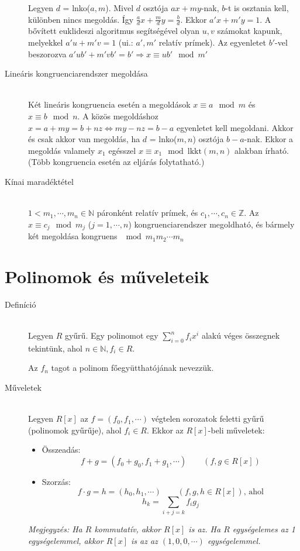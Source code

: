 \documentclass[margin=0px]{article}
\newcommand{\N}{\mathbb{N}}
\newcommand{\Z}{\mathbb{Z}}
\begin{document}
\begin{description}
        Legyen $d$ = lnko($a,m$). Mivel $d$ osztója $ax+my$-nak, $b$-t is osztania kell, különben nincs megoldás. Így $\frac{a}{d}x+\frac{m}{d}y = \frac{b}{d}$. Ekkor $a'x+m'y = 1$. A bővített euklideszi algoritmus segítségével olyan $u,v$ számokat kapunk, melyekkel $a'u+m'v = 1$ (ui.: $a', m'$ relatív prímek). Az egyenletet $b'$-vel beszorozva $a'ub'+m'vb' = b' \Rightarrow x \equiv ub' \mod{m'}$
    \item[Lineáris kongruenciarendszer megoldása] \hfill \\
        Két lineáris kongruencia esetén a megoldások $x \equiv a \mod{m}$ és $x \equiv b \mod{n}$. A közös megoldáshoz $x = a + my = b+ nz \Leftrightarrow my-nz = b-a$ egyenletet kell megoldani. Akkor és csak akkor van megoldás, ha $d$ = lnko($m,n$) osztója $b-a$-nak. Ekkor a megoldás valamely $x_1$ egésszel ${ x \equiv x_1 \mod{\textrm{lkkt}(m,n)}}$ alakban írható. (Több kongruencia esetén az eljárás folytatható.)
    \item[Kínai maradéktétel] \hfill \\
        $1 < m_1,\cdots,m_n \in\N$ páronként relatív prímek, és $c_1,\cdots,c_n \in\Z$. Az $x \equiv c_j \mod{m_j}$ ($j=1,\cdots,n$) kongruenciarendszer megoldható, és bármely két megoldása kongruens  $\mod{m_1m_2\cdots m_n}$
\end{description}
\section{Polinomok és műveleteik}
\begin{description}
    \item[Definíció] \hfill \\
        Legyen $R$ gyűrű. Egy polinomot egy $\sum_{i=0}^{n} f_ix^i$ alakú véges összegnek tekintünk, ahol $n\in\N, f_i \in R$.

        Az $f_n$ tagot a polinom főegyütthatójának nevezzük.
    \item[Műveletek] \hfill \\
        Legyen $R[x]$ az $f = (f_0, f_1, \cdots)$ végtelen sorozatok feletti gyűrű (polinomok gyűrűje), ahol $f_i \in R$. Ekkor az $R[x]$-beli műveletek:
        \begin{itemize}
            \item Összeadás: \\
                  \[f+g = (f_0+g_0, f_1+g_1,\cdots)\qquad (f,g \in R[x]) \]
            \item Szorzás: \\
                  \[f\cdot g = h = (h_0,h_1, \cdots) \qquad (f,g,h \in R[x]) \text{, ahol} \]
                  \[h_k = \sum\limits_{i+j = k}f_ig_j\]
        \end{itemize}

        \textit{Megjegyzés: Ha $R$ kommutatív, akkor $R[x]$ is az. Ha $R$ egységelemes az 1 egységelemmel, akkor $R[x]$ is az az $(1,0,0, \cdots)$ egységelemmel.}
\end{description}
\end{document}
